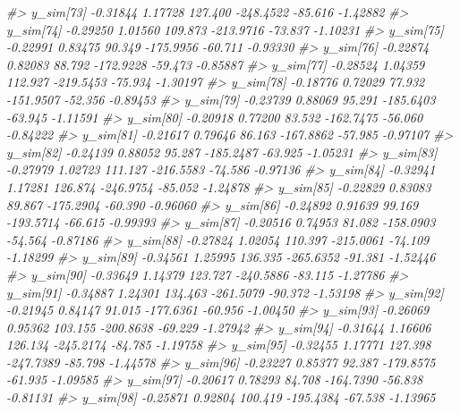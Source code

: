 \documentclass[
  10pt,
  italian,
  a4paper,
  extrafontsizes,onecolumn,openright
  ]{memoir}
\newenvironment{Shaded}{\begin{snugshade}}{\end{snugshade}}
\newcommand{\CommentTok}[1]{\textcolor[rgb]{0.56,0.35,0.01}{\textit{#1}}}
\begin{document}
\begin{Shaded}
\begin{Highlighting}[]
\CommentTok{\#\textgreater{} y\_sim[73]  {-}0.31844 1.17728 127.400 {-}248.4522 {-}85.616 {-}1.42882}
\CommentTok{\#\textgreater{} y\_sim[74]  {-}0.29250 1.01560 109.873 {-}213.9716 {-}73.837 {-}1.10231}
\CommentTok{\#\textgreater{} y\_sim[75]  {-}0.22991 0.83475  90.349 {-}175.9956 {-}60.711 {-}0.93330}
\CommentTok{\#\textgreater{} y\_sim[76]  {-}0.22874 0.82083  88.792 {-}172.9228 {-}59.473 {-}0.85887}
\CommentTok{\#\textgreater{} y\_sim[77]  {-}0.28524 1.04359 112.927 {-}219.5453 {-}75.934 {-}1.30197}
\CommentTok{\#\textgreater{} y\_sim[78]  {-}0.18776 0.72029  77.932 {-}151.9507 {-}52.356 {-}0.89453}
\CommentTok{\#\textgreater{} y\_sim[79]  {-}0.23739 0.88069  95.291 {-}185.6403 {-}63.945 {-}1.11591}
\CommentTok{\#\textgreater{} y\_sim[80]  {-}0.20918 0.77200  83.532 {-}162.7475 {-}56.060 {-}0.84222}
\CommentTok{\#\textgreater{} y\_sim[81]  {-}0.21617 0.79646  86.163 {-}167.8862 {-}57.985 {-}0.97107}
\CommentTok{\#\textgreater{} y\_sim[82]  {-}0.24139 0.88052  95.287 {-}185.2487 {-}63.925 {-}1.05231}
\CommentTok{\#\textgreater{} y\_sim[83]  {-}0.27979 1.02723 111.127 {-}216.5583 {-}74.586 {-}0.97136}
\CommentTok{\#\textgreater{} y\_sim[84]  {-}0.32941 1.17281 126.874 {-}246.9754 {-}85.052 {-}1.24878}
\CommentTok{\#\textgreater{} y\_sim[85]  {-}0.22829 0.83083  89.867 {-}175.2904 {-}60.390 {-}0.96060}
\CommentTok{\#\textgreater{} y\_sim[86]  {-}0.24892 0.91639  99.169 {-}193.5714 {-}66.615 {-}0.99393}
\CommentTok{\#\textgreater{} y\_sim[87]  {-}0.20516 0.74953  81.082 {-}158.0903 {-}54.564 {-}0.87186}
\CommentTok{\#\textgreater{} y\_sim[88]  {-}0.27824 1.02054 110.397 {-}215.0061 {-}74.109 {-}1.18299}
\CommentTok{\#\textgreater{} y\_sim[89]  {-}0.34561 1.25995 136.335 {-}265.6352 {-}91.381 {-}1.52446}
\CommentTok{\#\textgreater{} y\_sim[90]  {-}0.33649 1.14379 123.727 {-}240.5886 {-}83.115 {-}1.27786}
\CommentTok{\#\textgreater{} y\_sim[91]  {-}0.34887 1.24301 134.463 {-}261.5079 {-}90.372 {-}1.53198}
\CommentTok{\#\textgreater{} y\_sim[92]  {-}0.21945 0.84147  91.015 {-}177.6361 {-}60.956 {-}1.00450}
\CommentTok{\#\textgreater{} y\_sim[93]  {-}0.26069 0.95362 103.155 {-}200.8638 {-}69.229 {-}1.27942}
\CommentTok{\#\textgreater{} y\_sim[94]  {-}0.31644 1.16606 126.134 {-}245.2174 {-}84.785 {-}1.19758}
\CommentTok{\#\textgreater{} y\_sim[95]  {-}0.32455 1.17771 127.398 {-}247.7389 {-}85.798 {-}1.44578}
\CommentTok{\#\textgreater{} y\_sim[96]  {-}0.23227 0.85377  92.387 {-}179.8575 {-}61.935 {-}1.09585}
\CommentTok{\#\textgreater{} y\_sim[97]  {-}0.20617 0.78293  84.708 {-}164.7390 {-}56.838 {-}0.81131}
\CommentTok{\#\textgreater{} y\_sim[98]  {-}0.25871 0.92804 100.419 {-}195.4384 {-}67.538 {-}1.13965}

\end{Highlighting}
\end{Shaded}
\end{document}
